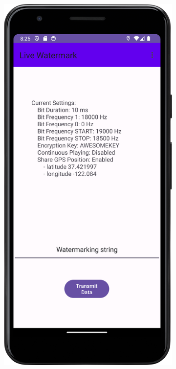 \begin{figure}
    \centering
    \begin{subfigure}{0.30\textwidth}
        \includegraphics[width=\linewidth]{LiveAudioWatermarking/images/home_frame.png}

\end{subfigure}
\end{figure}
